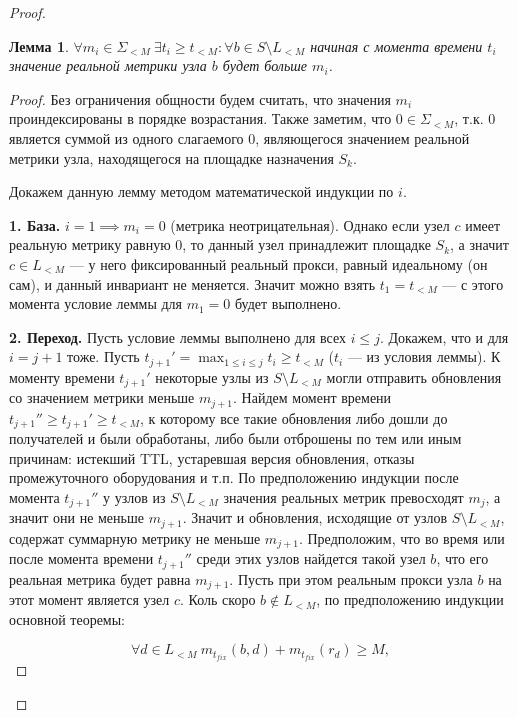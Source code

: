 \documentclass{article}
\theoremstyle{plain}
\theoremstyle{plain}
\theoremstyle{plain}
\newtheorem{lemma}{Лемма}[section]
\theoremstyle{plain}
\theoremstyle{definition}
\theoremstyle{remark}
\theoremstyle{plain}
\begin{document}
\begin{proof}
    \begin{lemma}
    \label{DecayLemma}
        $\forall m_i \in \Sigma_{< M}\ \exists t_i \geq t_{< M} : \forall b \in S \setminus L_{< M}$ начиная с момента времени $t_i$ значение реальной метрики узла $b$ будет больше $m_i$.
    \end{lemma}
    \begin{proof}
        Без ограничения общности будем считать, что значения $m_i$ проиндексированы в порядке возрастания. Также заметим, что $0 \in \Sigma_{< M}$, т.к. $0$ является суммой из одного слагаемого $0$, являющегося значением реальной метрики узла, находящегося на площадке назначения $S_k$.
        
        Докажем данную лемму методом математической индукции по $i$.
        
        \textbf{1. База.} $i = 1 \implies m_i = 0$ (метрика неотрицательная). Однако если узел $c$ имеет реальную метрику равную $0$, то данный узел принадлежит площадке $S_k$, а значит $c \in L_{< M}$ --- у него фиксированный реальный прокси, равный идеальному (он сам), и данный инвариант не меняется. Значит можно взять $t_1 = t_{< M}$ --- с этого момента условие леммы для $m_1 = 0$ будет выполнено.
        
        \textbf{2. Переход.} Пусть условие леммы выполнено для всех $i \leq j$. Докажем, что и для $i = j + 1$ тоже. Пусть $t_{j + 1}' = \displaystyle \max_{1 \leq i \leq j} t_i \geq t_{< M}$ ($t_i$ --- из условия леммы). К моменту времени $t_{j + 1}'$ некоторые узлы из $S \setminus L_{< M}$ могли отправить обновления со значением метрики меньше $m_{j + 1}$. Найдем момент времени $t_{j + 1}'' \geq t_{j + 1}' \geq t_{< M}$, к которому все такие обновления либо дошли до получателей и были обработаны, либо были отброшены по тем или иным причинам: истекший TTL, устаревшая версия обновления, отказы промежуточного оборудования и т.п. По предположению индукции после момента $t_{j + 1}''$ у узлов из $S \setminus L_{< M}$ значения реальных метрик превосходят $m_j$, а значит они не меньше $m_{j + 1}$. Значит и обновления, исходящие от узлов $S \setminus L_{< M}$, содержат суммарную метрику не меньше $m_{j + 1}$. Предположим, что во время или после момента времени $t_{j + 1}''$ среди этих узлов найдется такой узел $b$, что его реальная метрика будет равна $m_{j + 1}$. Пусть при этом реальным прокси узла $b$ на этот момент является узел $c$. Коль скоро $b \notin L_{< M}$, по предположению индукции основной теоремы:
        
        \begin{equation}
        \label{CantImproveByStable}
            \forall d \in L_{< M}\ m_{t_{fix}}(b, d) + m_{t_{fix}}(r_d) \geq M,
        \end{equation}
        

\end{proof}
\end{proof}
\end{document}

